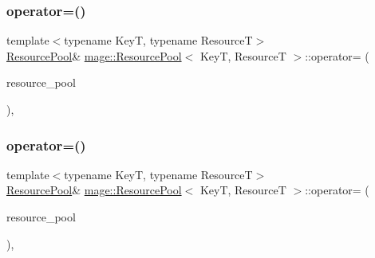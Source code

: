 \subsubsection{\texorpdfstring{operator=()}{operator=()}\hspace{0.1cm}{\footnotesize\ttfamily [1/2]}}
{\footnotesize\ttfamily template$<$typename KeyT, typename ResourceT$>$ \\
\hyperlink{classmage_1_1_resource_pool}{Resource\+Pool}\& \hyperlink{classmage_1_1_resource_pool}{mage\+::\+Resource\+Pool}$<$ KeyT, ResourceT $>$\+::operator= (\begin{DoxyParamCaption}\item[{const \hyperlink{classmage_1_1_resource_pool}{Resource\+Pool}$<$ KeyT, ResourceT $>$ \&}]{resource\+\_\+pool }\end{DoxyParamCaption})\hspace{0.3cm}{\ttfamily [private]}, {\ttfamily [delete]}}

\hypertarget{classmage_1_1_resource_pool_a1c0c196460508108435c227c11a65b94}{}\label{classmage_1_1_resource_pool_a1c0c196460508108435c227c11a65b94} 
\subsubsection{\texorpdfstring{operator=()}{operator=()}\hspace{0.1cm}{\footnotesize\ttfamily [2/2]}}
{\footnotesize\ttfamily template$<$typename KeyT, typename ResourceT$>$ \\
\hyperlink{classmage_1_1_resource_pool}{Resource\+Pool}\& \hyperlink{classmage_1_1_resource_pool}{mage\+::\+Resource\+Pool}$<$ KeyT, ResourceT $>$\+::operator= (\begin{DoxyParamCaption}\item[{\hyperlink{classmage_1_1_resource_pool}{Resource\+Pool}$<$ KeyT, ResourceT $>$ \&\&}]{resource\+\_\+pool }\end{DoxyParamCaption})\hspace{0.3cm}{\ttfamily [private]}, {\ttfamily [delete]}}

\hypertarget{classmage_1_1_resource_pool_a83a33e15bd8f326d0ebc11b3f8e52a41}{}\label{classmage_1_1_resource_pool_a83a33e15bd8f326d0ebc11b3f8e52a41} 
